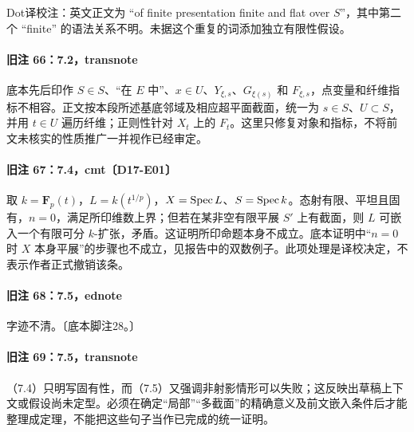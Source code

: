 Dot译校注：英文正文为 ``of finite presentation finite and flat over $S$''，其中第二个 ``finite'' 的语法关系不明。未据这个重复的词添加独立有限性假设。

\paragraph{旧注 66：7.2，transnote}

底本先后印作 $S\in S$、“在 $E$ 中”、$x\in U$、$Y_{\xi,s}$、$G_{\xi(s)}$ 和 $F_{\xi,s}$，点变量和纤维指标不相容。正文按本段所述基底邻域及相应超平面截面，统一为 $s\in S$、$U\subset S$，并用 $t\in U$ 遍历纤维；正则性针对 $X_t$ 上的 $F_t$。这里只修复对象和指标，不将前文未核实的性质推广一并视作已经审定。

\paragraph{旧注 67：7.4，cmt〔D17-E01〕}

取 $k=\mathbf F_p(t)$，$L=k(t^{1/p})$，$X=\operatorname{Spec} L$、$S=\operatorname{Spec} k$。态射有限、平坦且固有，$n=0$，满足所印维数上界；但若在某非空有限平展 $S'$ 上有截面，则 $L$ 可嵌入一个有限可分 $k$-扩张，矛盾。这证明所印命题本身不成立。底本证明中“$n=0$ 时 $X$ 本身平展”的步骤也不成立，见报告中的双数例子。此项处理是译校决定，不表示作者正式撤销该条。

\paragraph{旧注 68：7.5，ednote}

字迹不清。〔底本脚注28。〕

\paragraph{旧注 69：7.5，transnote}

（7.4）只明写固有性，而（7.5）又强调非射影情形可以失败；这反映出草稿上下文或假设尚未定型。必须在确定“局部”“多截面”的精确意义及前文嵌入条件后才能整理成定理，不能把这些句子当作已完成的统一证明。
